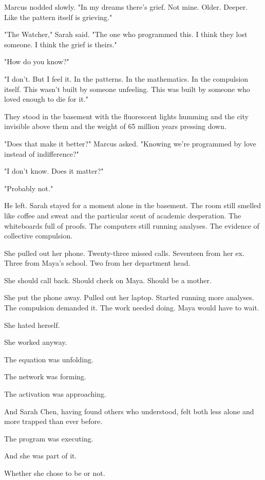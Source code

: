 Marcus nodded slowly. "In my dreams there's grief. Not mine. Older. Deeper. Like the pattern itself is grieving."

"The Watcher," Sarah said. "The one who programmed this. I think they lost someone. I think the grief is theirs."

"How do you know?"

"I don't. But I feel it. In the patterns. In the mathematics. In the compulsion itself. This wasn't built by someone unfeeling. This was built by someone who loved enough to die for it."

They stood in the basement with the fluorescent lights humming and the city invisible above them and the weight of 65 million years pressing down.

"Does that make it better?" Marcus asked. "Knowing we're programmed by love instead of indifference?"

"I don't know. Does it matter?"

"Probably not."

He left. Sarah stayed for a moment alone in the basement. The room still smelled like coffee and sweat and the particular scent of academic desperation. The whiteboards full of proofs. The computers still running analyses. The evidence of collective compulsion.

She pulled out her phone. Twenty-three missed calls. Seventeen from her ex. Three from Maya's school. Two from her department head.

She should call back. Should check on Maya. Should be a mother.

She put the phone away. Pulled out her laptop. Started running more analyses. The compulsion demanded it. The work needed doing. Maya would have to wait.

She hated herself.

She worked anyway.

The equation was unfolding.

The network was forming.

The activation was approaching.

And Sarah Chen, having found others who understood, felt both less alone and more trapped than ever before.

The program was executing.

And she was part of it.

Whether she chose to be or not.

